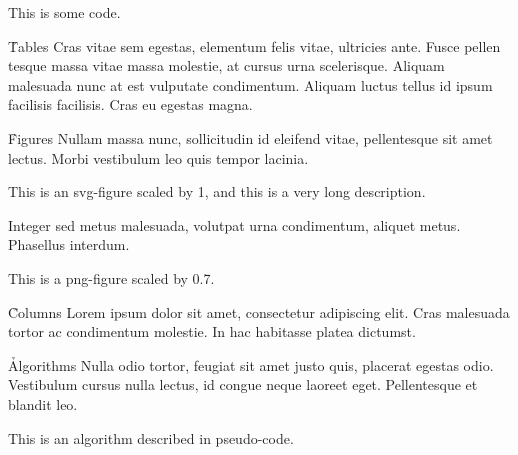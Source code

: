 \documentclass[twocolumn]{paper}
\begin{document}
    {This is some code.}

\h{Tables}
Cras vitae sem egestas, elementum felis vitae, ultricies ante. Fusce pellen tesque massa vitae massa molestie, at cursus urna scelerisque. Aliquam malesuada nunc at est vulputate condimentum. Aliquam luctus tellus id ipsum facilisis facilisis. Cras eu egestas magna.


\h{Figures}
Nullam massa nunc, sollicitudin id eleifend vitae, pellentesque sit amet lectus. Morbi vestibulum leo quis tempor lacinia.

    {This is an svg-figure scaled by 1, and this is a very long description.}

Integer sed metus malesuada, volutpat urna condimentum, aliquet metus. Phasellus interdum.

    {This is a png-figure scaled by 0.7.}


\h{Columns}
Lorem ipsum dolor sit amet, consectetur adipiscing elit. Cras malesuada tortor ac condimentum molestie. In hac habitasse platea dictumst.


\h{Algorithms}
Nulla odio tortor, feugiat sit amet justo quis, placerat egestas odio. Vestibulum cursus nulla lectus, id congue neque laoreet eget. Pellentesque et blandit leo.

    {This is an algorithm described in pseudo-code.}
\end{document}
